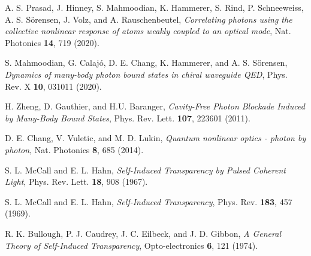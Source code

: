 \documentclass[pra,twocolumn,showpacs,preprintnumbers,amsmath,amssymb]{revtex4-1}
\begin{document}
\begin{thebibliography}{99}
 A. S. Prasad, J. Hinney, S. Mahmoodian, K. Hammerer, S. Rind, P. Schneeweiss, A. S. S\"orensen, J. Volz, and  A. Rauschenbeutel, \textit{Correlating photons using the collective nonlinear response of atoms weakly coupled to an optical mode}, Nat. Photonics {\bf 14}, 719 (2020).









 S. Mahmoodian, G. Calaj\'o, D. E. Chang, K. Hammerer, and A. S. S\"orensen, \textit{Dynamics of many-body photon bound states in chiral waveguide QED},   Phys. Rev. X {\bf 10}, 031011 (2020).





 H. Zheng, D. Gauthier, and H.U. Baranger, \textit{Cavity-Free Photon Blockade Induced by Many-Body Bound States}, Phys. Rev. Lett. {\bf 107}, 223601 (2011).








 D. E. Chang, V. Vuletic, and M. D. Lukin,  \textit{Quantum nonlinear optics - photon by photon},   Nat. Photonics  {\bf 8}, 685 (2014).

 S. L. McCall and E. L. Hahn, \textit{Self-Induced Transparency by Pulsed Coherent Light},   Phys. Rev. Lett. {\bf 18}, 908 (1967). 

 S. L. McCall and E. L. Hahn, \textit{Self-Induced Transparency},   
Phys. Rev.  {\bf 183}, 457 (1969). 

 R. K. Bullough, P. J. Caudrey, J. C. Eilbeck, and J. D. Gibbon, \textit{A General Theory of Self-Induced Transparency},   
Opto-electronics  {\bf 6}, 121 (1974).






\end{thebibliography}
\end{document}
